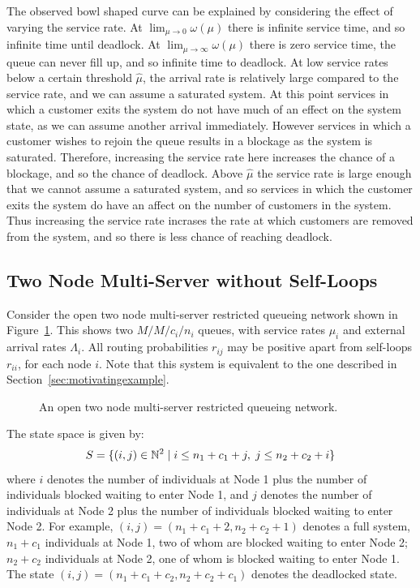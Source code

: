 \documentclass{article}
\numberwithin{equation}{section}
\begin{document}
The observed bowl shaped curve can be explained by considering the effect of
varying the service rate.
At $\lim_{\mu \to 0} \omega(\mu)$ there is infinite service time, and so
infinite time until deadlock.
At $\lim_{\mu \to \infty} \omega(\mu)$ there is zero service time, the queue can
never fill up, and so infinite time to deadlock.
At low service rates below a certain threshold $\hat{\mu}$, the arrival rate is
relatively large compared to the service rate, and we can assume a saturated
system.
At this point services in which a customer exits the system do not have much of
an effect on the system state, as we can assume another arrival immediately.
However services in which a customer wishes to rejoin the queue results in a
blockage as the system is saturated.
Therefore, increasing the service rate here increases the chance of a blockage,
and so the chance of deadlock.
Above $\hat{\mu}$ the service rate is large enough that we cannot assume a
saturated system, and so services in which the customer exits the system do have
an affect on the number of customers in the system.
Thus increasing the service rate incrases the rate at which customers are
removed from the system, and so there is less chance of reaching deadlock.


\subsection{Two Node Multi-Server without Self-Loops}\label{sec:2nodeMS}

Consider the open two node multi-server restricted queueing network shown in
Figure~\ref{fig:queueingnetwork_2nodemulti}.
This shows two \(M/M/c_i/n_i\) queues, with service rates $\mu_i$ and external
arrival rates $\Lambda_i$.
All routing probabilities $r_{ij}$ may be positive apart from self-loops
$r_{ii}$, for each node $i$.
Note that this system is equivalent to the one described in
Section~\ref{sec:motivatingexample}.

\begin{figure}[!htbp]
  \begin{center}
  
  \end{center}
  \caption{An open two node multi-server restricted queueing network.}
  \label{fig:queueingnetwork_2nodemulti}
\end{figure}

The state space is given by:
    \[S = \{(i,j)\in\mathbb{N}^2 \nonscript\; | \nonscript\; i \leq n_1+c_1+j, \nonscript\; j \leq n_2+c_2+i\}\]
where $i$ denotes the number of individuals at Node 1 plus the number of
individuals blocked waiting to enter Node 1, and $j$ denotes the number of
individuals at Node 2 plus the number of individuals blocked waiting to enter
Node 2.
For example, $(i, j) = (n_1+c_1+2, n_2+c_2+1)$ denotes a full system,
$n_1+c_1$ individuals at Node 1, two of whom are blocked waiting to enter
Node 2; $n_2+c_2$ individuals at Node 2, one of whom is blocked waiting to
enter Node 1.
The state $(i, j) = (n_1+c_1+c_2, n_2+c_2+c_1)$ denotes the deadlocked state.
\end{document}
